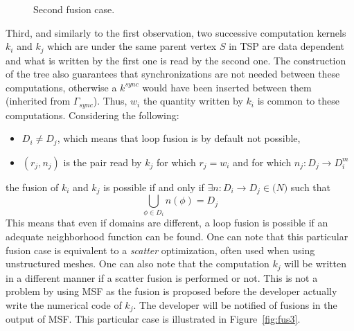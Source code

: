 \begin{figure}[h!]
\begin{center}
\caption{Second fusion case.}
\label{fig:fus2}
\end{center}
\end{figure}

Third, and similarly to the first observation, two successive computation kernels $k_i$ and $k_j$ which are under the same parent vertex $S$ in TSP are data dependent and what is written by the first one is read by the second one. The construction of the tree also guarantees that synchronizations are not needed between these computations, otherwise a $k^{sync}$ would have been inserted between them (inherited from $\Gamma_{sync}$). Thus, $w_i$ the quantity written by $k_i$ is common to these computations. Considering the following:
\begin{itemize}
\item $D_i \neq D_j$, which means that loop fusion is by default not possible,
\item $(r_j,n_j)$ is the pair read by $k_j$ for which $r_j=w_i$ and for which $n_j:D_j \rightarrow D_i^m$
\end{itemize}
the fusion of $k_i$ and $k_j$ is possible if and only if $\exists n:D_i \rightarrow D_j \in \mathcal(N)$ such that
\begin{equation*}
\bigcup_{\phi \in D_i} n(\phi) = D_j
\end{equation*}
This means that even if domains are different, a loop fusion is possible if an adequate neighborhood function can be found. One can note that this particular fusion case is equivalent to a \emph{scatter} optimization, often used when using unstructured meshes. One can also note that the computation $k_j$ will be written in a different manner if a scatter fusion is performed or not. This is not a problem by using MSF as the fusion is proposed before the developer actually write the numerical code of $k_j$. The developer will be notified of fusions in the output of MSF. This particular case is illustrated in Figure~\ref{fig:fus3}.

